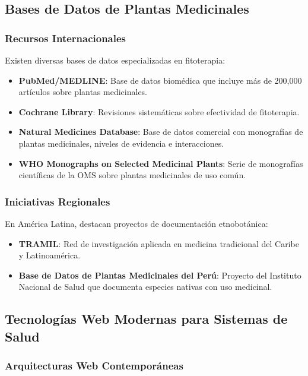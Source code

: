 \documentclass[12pt,a4paper]{article}
\begin{document}
\subsection{Bases de Datos de Plantas Medicinales}

\subsubsection{Recursos Internacionales}

Existen diversas bases de datos especializadas en fitoterapia:

\begin{itemize}
    \item \textbf{PubMed/MEDLINE}: Base de datos biomédica que incluye más de 200,000 artículos sobre plantas medicinales.
    \item \textbf{Cochrane Library}: Revisiones sistemáticas sobre efectividad de fitoterapia.
    \item \textbf{Natural Medicines Database}: Base de datos comercial con monografías de plantas medicinales, niveles de evidencia e interacciones.
    \item \textbf{WHO Monographs on Selected Medicinal Plants}: Serie de monografías científicas de la OMS sobre plantas medicinales de uso común\cite{WHO1999}.
\end{itemize}

\subsubsection{Iniciativas Regionales}

En América Latina, destacan proyectos de documentación etnobotánica:

\begin{itemize}
    \item \textbf{TRAMIL}: Red de investigación aplicada en medicina tradicional del Caribe y Latinoamérica.
    \item \textbf{Base de Datos de Plantas Medicinales del Perú}: Proyecto del Instituto Nacional de Salud que documenta especies nativas con uso medicinal\cite{INS2018}.
\end{itemize}

\subsection{Tecnologías Web Modernas para Sistemas de Salud}

\subsubsection{Arquitecturas Web Contemporáneas}
\end{document}
